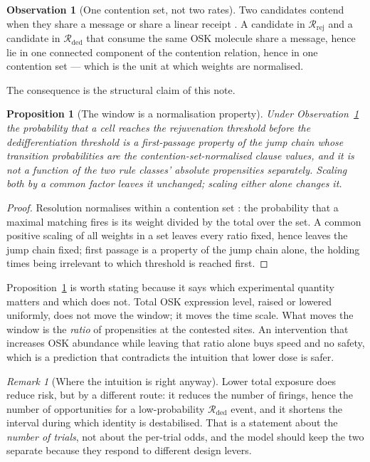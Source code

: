 \documentclass[11pt,a4paper]{article}
\theoremstyle{plain}
\newtheorem{proposition}[theorem]{Proposition}
\theoremstyle{definition}
\newtheorem{observation}[theorem]{Observation}
\theoremstyle{remark}
\newtheorem{remark}[theorem]{Remark}
\newcommand{\Rej}{\mathcal{R}_{\mathrm{rej}}}
\newcommand{\Ded}{\mathcal{R}_{\mathrm{ded}}}
\begin{document}
\begin{observation}[One contention set, not two rates]\label{obs:contend}
Two candidates contend when they share a message or share a linear receipt
\cite[Def.~2.4]{Interventions}. A candidate in $\Rej$ and a candidate in
$\Ded$ that consume the same OSK molecule share a message, hence lie in one
connected component of the contention relation, hence in one contention set
--- which is the unit at which weights are normalised.
\end{observation}

The consequence is the structural claim of this note.

\begin{proposition}[The window is a normalisation property]\label{prop:window}
Under Observation~\ref{obs:contend} the probability that a cell reaches the
rejuvenation threshold before the dedifferentiation threshold is a
first-passage property of the jump chain whose transition probabilities are
the contention-set-normalised clause values, and it is not a function of the
two rule classes' absolute propensities separately. Scaling both by a common
factor leaves it unchanged; scaling either alone changes it.
\end{proposition}

\begin{proof}
Resolution normalises within a contention set
\cite[Def.~2.6]{Interventions}: the probability that a maximal matching fires
is its weight divided by the total over the set. A common positive scaling of
all weights in a set leaves every ratio fixed, hence leaves the jump chain
fixed; first passage is a property of the jump chain alone, the holding times
being irrelevant to which threshold is reached first.
\end{proof}

Proposition~\ref{prop:window} is worth stating because it says which
experimental quantity matters and which does not. Total OSK expression level,
raised or lowered uniformly, does not move the window; it moves the time
scale. What moves the window is the \emph{ratio} of propensities at the
contested sites. An intervention that increases OSK abundance while leaving
that ratio alone buys speed and no safety, which is a prediction that
contradicts the intuition that lower dose is safer.

\begin{remark}[Where the intuition is right anyway]\label{rem:window2}
Lower total exposure does reduce risk, but by a different route: it reduces
the number of firings, hence the number of opportunities for a low-probability
$\Ded$ event, and it shortens the interval during which identity is
destabilised. That is a statement about the \emph{number of trials}, not about
the per-trial odds, and the model should keep the two separate because they
respond to different design levers.
\end{remark}
\end{document}
